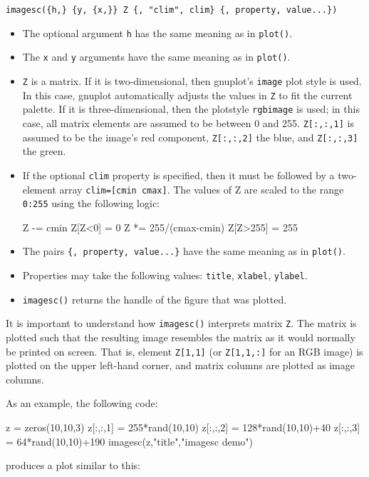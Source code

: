 \documentclass[11pt]{article}
\newcommand{\cmd}[1]{\texttt{#1}}
\begin{document}
\cmd{imagesc(\{h,\} \{y, \{x,\}\} Z \{, "clim", clim\} \{, property, value...\})}

\begin{itemize}
	\item The optional argument \cmd{h} has the same meaning as in
		\cmd{plot()}.
	\item The \cmd{x} and \cmd{y} arguments have the same meaning as in
		\cmd{plot()}.
	\item \cmd{Z} is a matrix. If it is two-dimensional, then gnuplot's
		\cmd{image} plot style is used. In this case, gnuplot
		automatically adjusts the values in \cmd{Z} to fit the current palette. If it is three-dimensional, then
		the plotstyle \cmd{rgbimage} is used; in this case, all matrix elements
		are assumed to be between 0 and 255. \cmd{Z[:,:,1]} is assumed to be
		the image's red component, \cmd{Z[:,:,2]} the blue, and \cmd{Z[:,:,3]}
		the green.
	\item If the optional \cmd{clim} property is specified, then it must be
		followed by a two-element
		array \cmd{clim=[cmin cmax]}. The values of Z
		are scaled to the range \cmd{0:255} using the following logic:
		\begin{juliacode}
Z -= cmin
Z[Z<0] = 0
Z *= 255/(cmax-cmin)
Z[Z>255] = 255
		\end{juliacode}
	\item The pairs \cmd{\{, property, value...\}} have the same meaning as in
		\cmd{plot()}.
	\item Properties may take the following values:
		\cmd{title}, \cmd{xlabel}, \cmd{ylabel}.
	\item \cmd{imagesc()} returns the handle of the figure that was plotted.
\end{itemize}

It is important to understand how \cmd{imagesc()} interprets matrix \cmd{Z}.
The matrix is plotted such that the resulting image resembles the matrix as it
would normally be printed on screen. That is, element \cmd{Z[1,1]} (or
\cmd{Z[1,1,:]} for an RGB image) is plotted on the upper left-hand corner, and
matrix columns are plotted as image columns.

As an example, the following code:

\begin{juliacode}
z = zeros(10,10,3)
z[:,:,1] = 255*rand(10,10)
z[:,:,2] = 128*rand(10,10)+40
z[:,:,3] = 64*rand(10,10)+190
imagesc(z,"title","imagesc demo")
\end{juliacode}

produces a plot similar to this:
\end{document}
